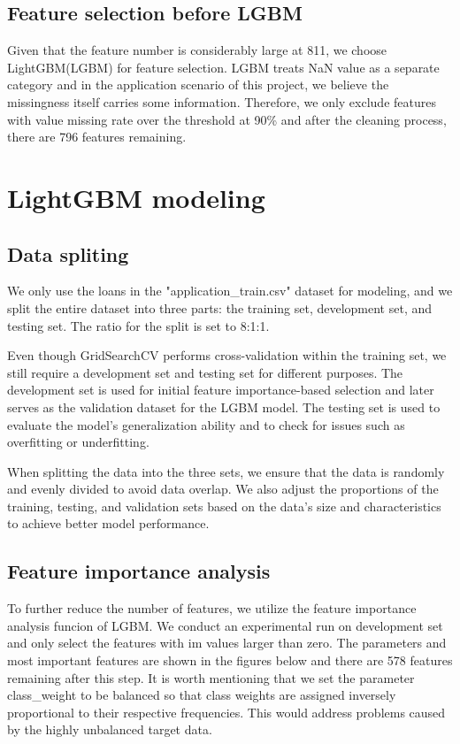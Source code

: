 \documentclass{article}
\begin{document}
\subsection{Feature selection before LGBM}

Given that the feature number is considerably large at 811, we choose LightGBM(LGBM) for feature selection. LGBM treats NaN value as a separate category and in the application scenario of this project, we believe the missingness itself carries some information. Therefore, we only exclude features with value missing rate over the threshold at 90\% and after the cleaning process, there are 796 features remaining.

\section{LightGBM modeling}

\subsection{Data spliting}
We only use the loans in the "application\_train.csv" dataset for modeling, and we split the entire dataset into three parts: the training set, development set, and testing set. The ratio for the split is set to 8:1:1.

Even though GridSearchCV performs cross-validation within the training set, we still require a development set and testing set for different purposes. The development set is used for initial feature importance-based selection and later serves as the validation dataset for the LGBM model. The testing set is used to evaluate the model's generalization ability and to check for issues such as overfitting or underfitting.

When splitting the data into the three sets, we ensure that the data is randomly and evenly divided to avoid data overlap. We also adjust the proportions of the training, testing, and validation sets based on the data's size and characteristics to achieve better model performance.

\subsection{Feature importance analysis}

To further reduce the number of features, we utilize the feature importance analysis funcion of LGBM. We conduct an experimental run on development set and only select the features with im values larger than zero. The parameters and most important features are shown in the figures below and there are 578 features remaining after this step. It is worth mentioning that we set the parameter class\_weight to be balanced so that class weights are assigned inversely proportional to their respective frequencies. This would address problems caused by the highly unbalanced target data.
\end{document}
